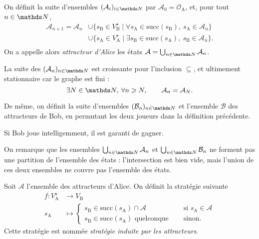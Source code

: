 \begin{defn}
	On définit la suite d'ensembles $(\mathcal{A}_i)_{i\in\N}$\/ par $\mathcal{A}_0 = \mathcal{O}_\mathrm{A}$, et, pour tout $n \in \N$,
	\begin{align*}
		\mathcal{A}_{n+1} = \mathcal{A}_n &\cup \{s_\mathrm{B} \in V_\mathrm{B}^\star  \mid \forall s_\mathrm{A} \in \mathrm{succ}(s_\mathrm{B}),\: s_\mathrm{A} \in \mathcal{A}_n \}\\
		&\cup \{s_\mathrm{A} \in V_\mathrm{A}^\star  \mid \exists s_\mathrm{B} \in \mathrm{succ}(s_\mathrm{A}),\: s_\mathrm{B} \in \mathcal{A}_n \}.\\
	\end{align*}
	On a appelle alors \textit{attracteur d'Alice} les états $\mathcal{A} = \bigcup_{n \in \N} \mathcal{A}_n$.
\end{defn}

\begin{rmk}
	La suite des $(\mathcal{A}_n)_{n \in \N}$\/ est croissante pour l'inclusion $\subseteq$, et ultimement stationnaire car le graphe est fini : \[
		\exists N \in \N,\: \forall n \ge N,\quad\quad \mathcal{A}_n = \mathcal{A}_N
	.\]
\end{rmk}

De même, on définit la suite d'ensembles $(\mathcal{B}_n)_{n \in \N}$\/ et l'ensemble $\mathcal{B}$\/ des attracteurs de Bob, en permutant les deux joueurs dans la définition précédente.

\begin{exm}
	Si Bob joue intelligemment, il est garanti de gagner.
\end{exm}

\begin{rmk}
	On remarque que les ensembles $\bigcup_{n \in \N} \mathcal{A}_n$\/ et $\bigcup_{n\in \N} \mathcal{B}_n$\/ ne forment pas une partition de l'ensemble des états : l'intersection est bien vide, mais l'union de ces deux ensembles ne couvre pas l'ensemble des états.
\end{rmk}

\begin{defn}
	Soit $\mathcal{A}$\/ l'ensemble des attracteurs d'Alice. On définit la stratégie suivante
	\begin{align*}
		f: V_\mathrm{A}^\star &\longrightarrow V_\mathrm{B} \\
		s_\mathrm{A} &\longmapsto \begin{cases}
			s_\mathrm{B} \in \mathrm{succ}(s_\mathrm{A}) \cap \mathcal{A} & \quad\text{ si } s_\mathrm{A} \in \mathcal{A}\\
			s_\mathrm{B} \in \mathrm{succ}(s_\mathrm{A}) \text{ quelconque} & \quad \text{ sinon}.
		\end{cases}
	\end{align*}
	Cette stratégie est nommée \textit{stratégie induite par les attracteurs}.
\end{defn}

